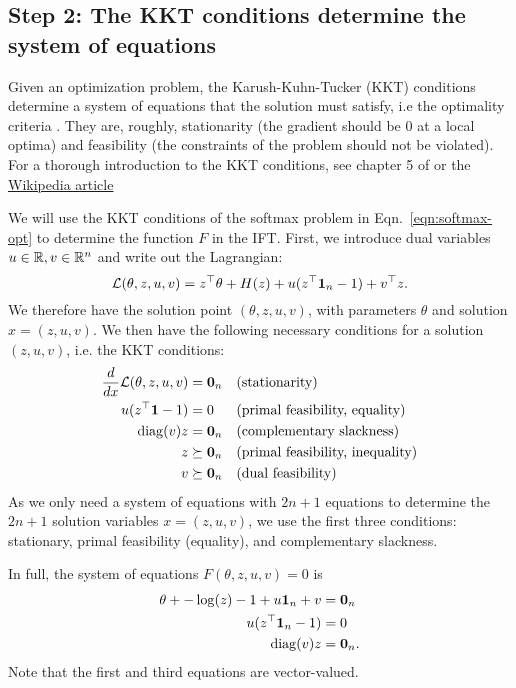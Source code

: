 \documentclass[11pt]{article}
\begin{document}
\subsection*{Step 2: The KKT conditions determine the system of equations}
Given an optimization problem, the Karush-Kuhn-Tucker (KKT) conditions
determine a system of equations that the solution must satisfy,
i.e the optimality criteria \citep{kkt-thesis,kkt}.
They are, roughly, stationarity (the gradient should be 0 at a local optima)
and feasibility (the constraints of the problem should not be violated).
For a thorough introduction to the KKT conditions, see chapter 5 of \citet{bv-cvxbook}
or the \href{https://en.wikipedia.org/wiki/Karush-Kuhn-Tucker\_conditions}{Wikipedia article}

We will use the KKT conditions of the softmax problem in
Eqn.~\ref{eqn:softmax-opt} to determine the function $F$ in the IFT.
First, we introduce dual variables $u\in\mathbb{R},v\in\mathbb{R}^n$ and write out the Lagrangian:
$$\mathcal{L}(\theta, z, u, v) = z^\top\theta + H(z) + u(z^\top \mathbf{1}_n - 1) + v^\top z.$$
We therefore have the solution point $(\theta,z,u,v)$, with parameters $\theta$
and solution $x=(z,u,v)$.
We then have the following necessary conditions for a solution $(z,u,v)$,
i.e. the KKT conditions:
\begin{equation}
\begin{aligned}
\frac{d}{dx} \mathcal{L}(\theta, z,u,v) &= \mathbf{0}_n && \textrm{(stationarity)}\\
u(z^{\top} \mathbf{1} - 1) &= 0 && \textrm{(primal feasibility, equality)}\\
\mathrm{diag}(v)z &= \mathbf{0}_{n} && \textrm{(complementary slackness)}\\
z &\succeq \mathbf{0}_n && \textrm{(primal feasibility, inequality)}\\
v &\succeq \mathbf{0}_n && \textrm{(dual feasibility)}
\end{aligned}
\end{equation}
As we only need a system of equations with $2n+1$ equations to
determine the $2n+1$ solution variables $x=(z,u,v)$,
we use the first three conditions: stationary, primal feasibility (equality),
and complementary slackness.

In full, the system of equations $F(\theta, z,u,v) = 0$ is
\begin{equation}
\label{eqn:system}
\begin{aligned}
\theta + -\log(z) - 1 + u\mathbf{1}_n + v &= \mathbf{0}_n\\
u(z^{\top} \mathbf{1}_n - 1) &= 0\\
\mathrm{diag}(v)z &= \mathbf{0}_n.
\end{aligned}
\end{equation}
Note that the first and third equations are vector-valued.
\end{document}

